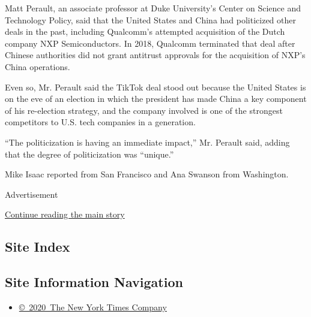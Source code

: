 Matt Perault, an associate professor at Duke University's Center on
Science and Technology Policy, said that the United States and China had
politicized other deals in the past, including Qualcomm's attempted
acquisition of the Dutch company NXP Semiconductors. In 2018, Qualcomm
terminated that deal after Chinese authorities did not grant antitrust
approvals for the acquisition of NXP's China operations.

Even so, Mr. Perault said the TikTok deal stood out because the United
States is on the eve of an election in which the president has made
China a key component of his re-election strategy, and the company
involved is one of the strongest competitors to U.S. tech companies in a
generation.

``The politicization is having an immediate impact,'' Mr. Perault said,
adding that the degree of politicization was ``unique.''

Mike Isaac reported from San Francisco and Ana Swanson from Washington.

Advertisement

\protect\hyperlink{after-bottom}{Continue reading the main story}

\hypertarget{site-index}{%
\subsection{Site Index}\label{site-index}}

\hypertarget{site-information-navigation}{%
\subsection{Site Information
Navigation}\label{site-information-navigation}}

\begin{itemize}
\tightlist
\item
  \href{https://help.nytimes3xbfgragh.onion/hc/en-us/articles/115014792127-Copyright-notice}{©~2020~The
  New York Times Company}
\end{itemize}

